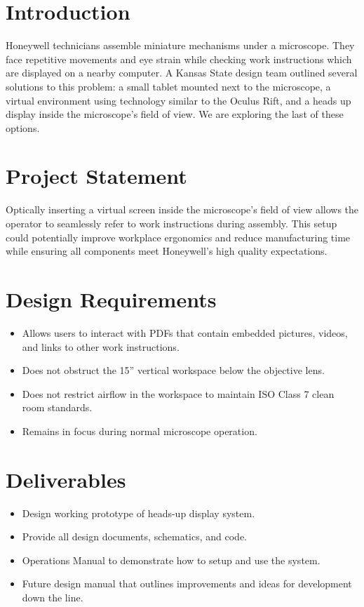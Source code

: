 \documentclass[12pt,a4paper]{article}
\begin{document}
\section{Introduction}
Honeywell technicians assemble miniature mechanisms under a microscope. They face repetitive movements and eye strain while checking work instructions which are displayed on a nearby computer. A Kansas State design team outlined several solutions to this problem: a small tablet mounted next to the microscope, a virtual environment using technology similar to the Oculus Rift, and a heads up display inside the microscope’s field of view. We are exploring the last of these options. 



\section{Project Statement}
Optically inserting a virtual screen inside the microscope’s field of view allows the operator to seamlessly refer to work instructions during assembly. This setup could potentially improve workplace ergonomics and reduce manufacturing time while ensuring all components meet Honeywell’s high quality expectations. 

\section{Design Requirements}

\begin{itemize}
	\item Allows users to interact with PDFs that contain embedded pictures, videos, and links to other work instructions.
	\item Does not obstruct the 15” vertical workspace below the objective lens.
	\item Does not restrict airflow in the workspace to maintain ISO Class 7 clean room standards.
	\item Remains in focus during normal microscope operation.
\end{itemize}

\section{Deliverables}
\begin{itemize}
	\item Design working prototype of heads-up display system.
	\item Provide all design documents, schematics, and code.
	\item Operations Manual to demonstrate how to setup and use the system.
	\item Future design manual that outlines improvements and ideas for development down the line.
\end{itemize}
\end{document}
